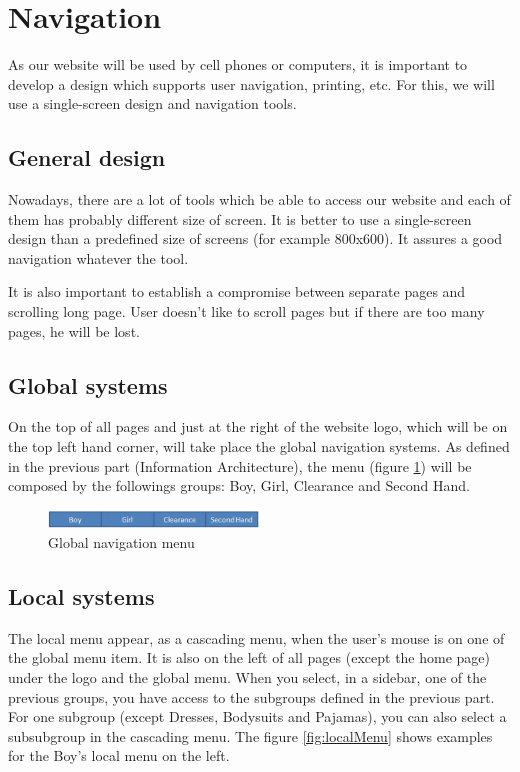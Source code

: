 \section{Navigation}

As our website will be used by cell phones or computers, it is important to develop a design which supports user navigation, printing, etc. For this, we will use a single-screen design and navigation tools.

\subsection{General design}

Nowadays, there are a lot of tools which be able to access our website and each of them has probably different size of screen. It is better to use a single-screen design than a predefined size of screens (for example 800x600). It assures a good navigation whatever the tool. 

It is also important to establish a compromise between separate pages and scrolling long page. User doesn't like to scroll pages but if there are too many pages, he will be lost.


\subsection{Global systems}

On the top of all pages and just at the right of the website logo, which will be on the top left hand corner, will take place the global navigation systems. As defined in the previous part (Information Architecture), the menu (figure \ref{fig:globalMenu}) will be composed by the followings groups: Boy, Girl, Clearance and Second Hand.

\begin{figure}[h!]
  \centering  
  \includegraphics[width=0.5\textwidth]{Images/globalMenu.jpg}                
  \caption{Global navigation menu}
  \label{fig:globalMenu}
\end{figure}


\subsection{Local systems}
The local menu appear, as a cascading menu, when the user's mouse is on one of the global menu item. It is also on the left of all pages (except the home page) under the logo and the global menu. When you select, in a sidebar, one of the previous groups, you have access to the subgroups defined in the previous part. For one subgroup (except Dresses, Bodysuits and Pajamas), you can also select a subsubgroup in the cascading menu. The figure \ref{fig:localMenu} shows examples for the Boy's local menu on the left.

